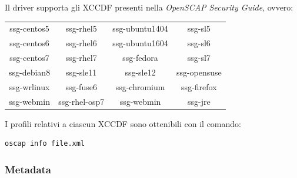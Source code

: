 \documentclass[../main.tex]{subfiles}
\begin{document}
Il driver supporta gli XCCDF presenti nella \textit{OpenSCAP Security Guide}, ovvero:
\begin{table}[H]
    \begin{tabulary}{\textwidth}{cccc}

         
        ssg-centos5 & ssg-rhel5     & ssg-ubuntu1404 & ssg-sl5      \\
        ssg-centos6 & ssg-rhel6     & ssg-ubuntu1604 & ssg-sl6      \\
        ssg-centos7 & ssg-rhel7     & ssg-fedora     & ssg-sl7      \\
        ssg-debian8 & ssg-sle11     & ssg-sle12      & ssg-opensuse \\
        ssg-wrlinux & ssg-fuse6     & ssg-chromium   & ssg-firefox  \\
        ssg-webmin  & ssg-rhel-osp7 & ssg-webmin     & ssg-jre

    \end{tabulary}
\end{table}
\vfill
\newpage
I profili relativi a ciascun XCCDF sono ottenibili con il comando:
\begin{Verbatim}[frame=single]
oscap info file.xml
\end{Verbatim}

\subsubsection{Metadata}
\end{document}
